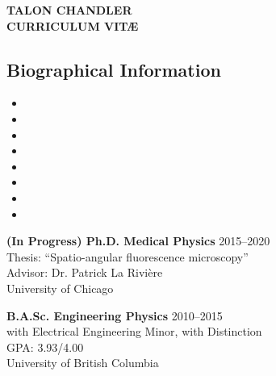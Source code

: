 \documentclass[12pt,letterpaper]{article}
\begin{document}
\begin{center}
{\Large \textbf{TALON CHANDLER}}\\
{\textbf{CURRICULUM VIT\AE}}\\
\end{center}

\vspace{-1em}

\subsection*{Biographical Information}
\begin{itemize}[noitemsep]
\item[]  
\item[]  
\item[]  
\item[] \itab{} 
\item[] \itab{} 
\item[]  
\item[]  
\item[]  
\end{itemize}

\begin{benumerate}{2}
\item
  \textbf{(In Progress) Ph.D. Medical Physics} \hfill 2015--2020\\
  Thesis: ``Spatio-angular fluorescence microscopy''\\
  Advisor: Dr. Patrick La Rivi\`ere \\
  University of Chicago
\item
  \textbf{B.A.Sc. Engineering Physics} \hfill 2010--2015\\
  with Electrical Engineering Minor, with Distinction\\
  GPA: 3.93/4.00\\
  University of British Columbia
\end{benumerate}

\nocite{*}
\setlength{}
\printbibliography[heading=none, type=article, sorting=ynt, resetnumbers=true]

\end{document}
